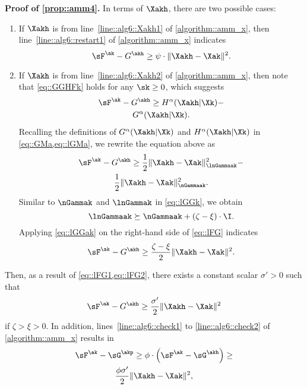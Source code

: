 \vspace{0.8em} 
\noindent\textbf{Proof of \ref{prop::amm4}.\;} In terms of $\Xakh$, there are two possible cases:
\begin{enumerate}[leftmargin=0.45cm]
\item If $\Xakh$ is from line~\ref{line::alg6::Xakh1} of \cref{algorithm::amm_x}, then line~\ref{line::alg6::restart1} of \cref{algorithm::amm_x} indicates
\begin{equation}\label{eq::lFG1}
\sF^{\ak}-G^{\akh}\geq  \psi\cdot\|\Xakh-\Xak\|^2.
\end{equation}
\item If $\Xakh$ is from line~\ref{line::alg6::Xakh2} of \cref{algorithm::amm_x}, then note that \cref{eq::GGHFk} holds for any $\sk\geq 0$, which suggests
\begin{multline}
\nonumber
\sF^{\ak}-G^{\akh}\geq H^\alpha(\Xakh|\Xk)-\\
G^\alpha(\Xakh|\Xk).
\end{multline}
Recalling the definitions of $G^\alpha(\Xakh|\Xk)$ and $H^\alpha(\Xakh|\Xk)$ in \cref{eq::GMa,eq::lGMa}, we rewrite the equation above as
\begin{multline}\label{eq::lFG}
\sF^{\ak}-G^{\akh}\geq \frac{1}{2}\|\Xakh-\Xak\|_{\lnGammaak}^2-\\
\frac{1}{2}\|\Xakh-\Xak\|_{\nGammaak}^2.
\end{multline}
Similar to $\nGammak$ and $\lnGammak$ in \cref{eq::lGGk}, we obtain
\begin{equation}\label{eq::lGGak}
\lnGammaak \succeq \nGammaak + (\zeta-\xi)\cdot\I.
\end{equation}
Applying \cref{eq::lGGak} on the right-hand side of \cref{eq::lFG} indicates
\begin{multline}\label{eq::lFG2}
	\sF^{\ak}-G^{\akh}\geq \frac{\zeta-\xi}{2}\|\Xakh-\Xak\|^2.
\end{multline}
\end{enumerate}
Then, as a result of \cref{eq::lFG1,eq::lFG2}, there exists a constant scalar $\sigma'>0$ such that
\begin{equation}\label{eq::lFG3}
	\sF^{\ak}-G^{\akh}\geq \frac{\sigma'}{2}\|\Xakh-\Xak\|^2
\end{equation}
if $\zeta>\xi>0$. In addition, lines~\ref{line::alg6::check1} to \ref{line::alg6::check2} of \cref{algorithm::amm_x} results in
\begin{multline}\label{eq::lFGak2}
\sF^{\ak} - \sG^{\akp} \geq \phi\cdot \Big(\sF^{\ak} - \sG^{\akh}\Big)\geq\\
\frac{\phi\sigma'}{2}\|\Xakh-\Xak\|^2,
\end{multline}
